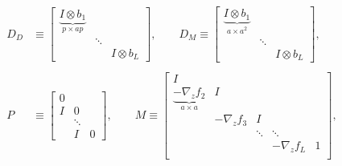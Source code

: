 \documentclass{article}
\begin{document}
\begin{align*}
    D_D    & \equiv \begin{bmatrix}
                        \underbrace{I \otimes b_1}_{p \times ap} &        &               \\
                                                                 & \ddots &               \\
                                                                 &        & I \otimes b_L
                    \end{bmatrix}
    ,
    \qquad
    D_M \equiv \begin{bmatrix}
                   \underbrace{I \otimes b_1}_{a \times a^2} &        &               \\
                                                             & \ddots &               \\
                                                             &        & I \otimes b_L
               \end{bmatrix}
    ,                                                                                                \\                                                                                     \\
    P      & \equiv \begin{bmatrix}
                        0 \\ I & 0 \\ &\ddots \\ &I&0
                    \end{bmatrix}
    ,    \qquad
    M       \equiv \begin{bmatrix}
                       I                                                                                    \\
                       \underbrace{-\nabla_z f_2}_{a \times a} & I                                          \\
                                                               & -\nabla_z f_3 & I                          \\
                                                               &               & \ddots & \ddots            \\
                                                               &               &        & -\nabla_z f_L & 1 \\
                   \end{bmatrix}
    ,                                                                                                \\

\end{align*}
\end{document}
